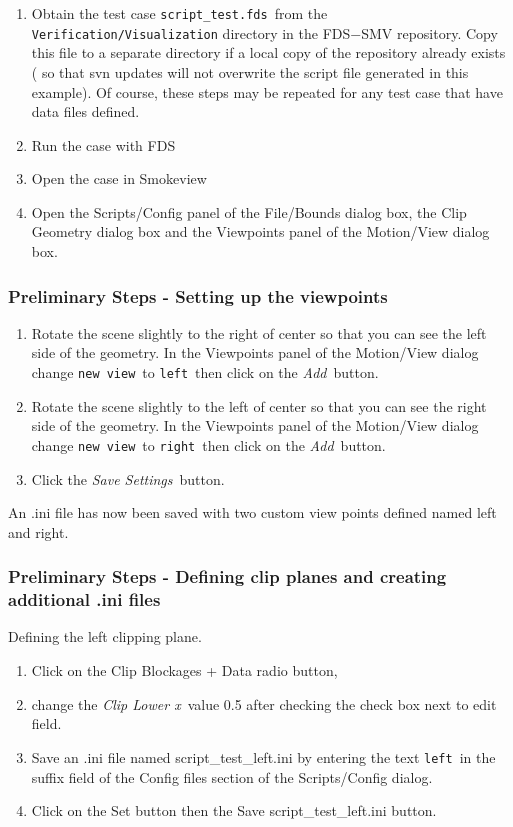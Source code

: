 \documentclass[11pt,twoside]{book}
\begin{document}
\begin{enumerate}
\item Obtain the test case {\tt script\_test.fds}\ from the
    {\tt Verification/Visualization} directory in
the FDS$-$SMV repository.  Copy this file to a separate directory
 if a local copy of the repository already exists
 ( so that svn updates will not overwrite the script file generated in this example).  Of course, these steps may be repeated
 for any test case that have data files defined.
\item Run the case with FDS
\item Open the case in Smokeview
\item Open the Scripts/Config panel of the File/Bounds dialog box,
the Clip Geometry dialog box and the Viewpoints panel of the Motion/View
dialog box.
\end{enumerate}

\subsubsection{Preliminary Steps - Setting up the viewpoints}

\begin{enumerate}
\item Rotate the scene slightly to the right of center so that you can see the left side of the geometry.  In the Viewpoints panel of the Motion/View dialog change {\tt new view}\ to {\tt left}\
    then click on the {\em Add}\ button.
\item Rotate the scene slightly to the left of center so that you can see the right side of the geometry.  In the Viewpoints panel of the Motion/View dialog change {\tt new view}\ to {\tt right}\
    then click on the {\em Add}\ button.
\item Click the {\em Save Settings}\ button.
\end{enumerate}

An .ini file has now been saved with two custom view points defined named left and right.

\subsubsection{Preliminary Steps - Defining clip planes and creating additional .ini files}

Defining the left clipping plane.
\begin{enumerate}
\item Click on the Clip Blockages + Data radio button,
\item change the {\em Clip Lower x}\ value 0.5 after checking the check box next to edit field.
\item Save an .ini file named script\_test\_left.ini by entering the text
{\tt left}\ in the suffix field of the Config files section of the Scripts/Config dialog.
\item Click on the Set button then the Save script\_test\_left.ini button.
\end{enumerate}
\end{document}
